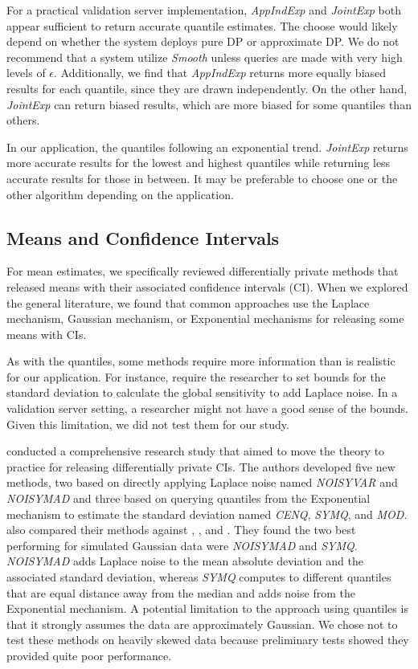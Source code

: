 For a practical validation server implementation, \textit{AppIndExp} and \textit{JointExp} both appear sufficient to return accurate quantile estimates. The choose would likely depend on whether the system deploys pure DP or approximate DP. We do not recommend that a system utilize \textit{Smooth} unless queries are made with very high levels of $\epsilon$. Additionally, we find that \textit{AppIndExp} returns more equally biased results for each quantile, since they are drawn independently. On the other hand, \textit{JointExp} can return biased results, which are more biased for some quantiles than others.

In our application, the quantiles following an exponential trend. \textit{JointExp} returns more accurate results for the lowest and highest quantiles while returning less accurate results for those in between. It may be preferable to choose one or the other algorithm depending on the application.

\subsection{Means and Confidence Intervals}
For mean estimates, we specifically reviewed differentially private methods that released means with their associated confidence intervals (CI). When we explored the general literature, we found that common approaches use the Laplace mechanism, Gaussian mechanism, or Exponential mechanisms for releasing some means with CIs.

As with the quantiles, some methods require more information than is realistic for our application. For instance, \cite{karwa2017finite, bowen2020comparative, d2015differential, biswas2020coinpress} require the researcher to set bounds for the standard deviation to calculate the global sensitivity to add Laplace noise. In a validation server setting, a researcher might not have a good sense of the bounds. Given this limitation, we did not test them for our study.

\cite{du2020differentially} conducted a comprehensive research study that aimed to move the theory to practice for releasing differentially private CIs. The authors developed five new methods, two based on directly applying Laplace noise named \textit{NOISYVAR} and \textit{NOISYMAD} and three based on querying quantiles from the Exponential mechanism  to estimate the standard deviation named \textit{CENQ}, \textit{SYMQ}, and \textit{MOD}. \cite{du2020differentially} also compared their methods against \cite{karwa2017finite}, \cite{d2015differential}, and \cite{brawner2018bootstrap}. They found the two best performing for simulated Gaussian data were \textit{NOISYMAD} and \textit{SYMQ}. \textit{NOISYMAD} adds Laplace noise to the mean absolute deviation and the associated standard deviation, whereas \textit{SYMQ} computes to different quantiles that are equal distance away from the median and adds noise from the Exponential mechanism. A potential limitation to the approach using quantiles is that it strongly assumes the data are approximately Gaussian. We chose not to test these methods on heavily skewed data because preliminary tests showed they provided quite poor performance.

